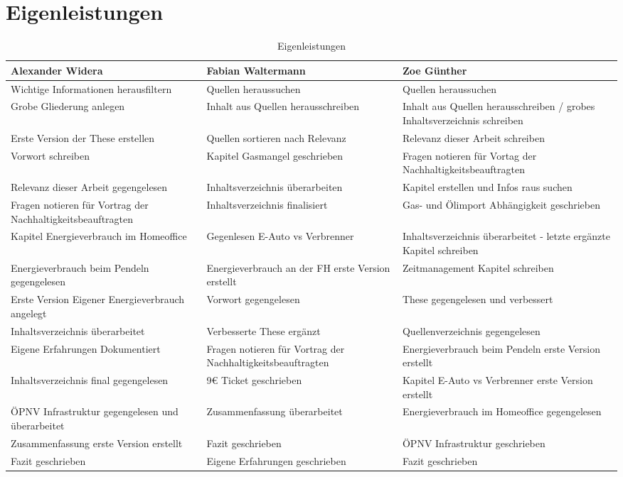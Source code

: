 \documentclass[a4paper,12pt]{scrartcl}
\begin{document}
\section{Eigenleistungen}
\begin{table}
\centering
\begin{tabular}[!htb]{p{4cm}|p{4cm}|p{4cm}}
Alexander Widera & Fabian Waltermann & Zoe Günther \\
\hline
Wichtige Informationen herausfiltern & Quellen heraussuchen & Quellen heraussuchen \\
Grobe Gliederung anlegen & Inhalt aus Quellen herausschreiben & Inhalt aus Quellen herausschreiben / grobes Inhaltsverzeichnis schreiben \\
Erste Version der These erstellen & Quellen sortieren nach Relevanz & Relevanz dieser Arbeit schreiben \\
Vorwort schreiben & Kapitel Gasmangel geschrieben & Fragen notieren für Vortag der Nachhaltigkeitsbeauftragten \\
Relevanz dieser Arbeit gegengelesen & Inhaltsverzeichnis überarbeiten & Kapitel erstellen und Infos raus suchen \\
Fragen notieren für Vortrag der Nachhaltigkeitsbeauftragten & Inhaltsverzeichnis finalisiert & Gas- und Ölimport Abhängigkeit geschrieben \\
Kapitel Energieverbrauch im Homeoffice & Gegenlesen E-Auto vs Verbrenner & Inhaltsverzeichnis überarbeitet - letzte ergänzte Kapitel schreiben \\ 
Energieverbrauch beim Pendeln gegengelesen & Energieverbrauch an der FH erste Version erstellt & Zeitmanagement Kapitel schreiben \\
Erste Version Eigener Energieverbrauch angelegt & Vorwort gegengelesen & These gegengelesen und verbessert \\
Inhaltsverzeichnis überarbeitet & Verbesserte These ergänzt & Quellenverzeichnis gegengelesen \\
Eigene Erfahrungen Dokumentiert & Fragen notieren für Vortrag der Nachhaltigkeitsbeauftragten & Energieverbrauch beim Pendeln erste Version erstellt \\
Inhaltsverzeichnis final gegengelesen & 9€ Ticket geschrieben & Kapitel E-Auto vs Verbrenner erste Version erstellt \\
ÖPNV Infrastruktur gegengelesen und überarbeitet & Zusammenfassung überarbeitet & Energieverbrauch im Homeoffice gegengelesen \\
Zusammenfassung erste Version erstellt & Fazit geschrieben & ÖPNV Infrastruktur geschrieben \\
Fazit geschrieben & Eigene Erfahrungen geschrieben & Fazit geschrieben \\

\end{tabular}
\caption{Eigenleistungen}
\end{table}
\end{document}
